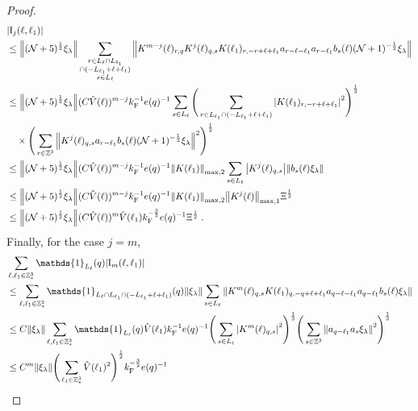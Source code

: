 \documentclass[12pt,a4paper]{article}
\numberwithin{equation}{section}
\newcommand{\1}{\mathbb{I}}
\newcommand{\F}{\mathrm{F}}
\newcommand{\I}{\mathrm{I}}
\newcommand{\Z}{\mathbb{Z}}
\newcommand{\NN}{\mathcal{N}}
\newcommand{\half}{\frac{1}{2}}
\theoremstyle{plain}
\theoremstyle{definition}
\theoremstyle{remark}
\theoremstyle{plain}
\theoremstyle{definition}
\theoremstyle{remark}
\begin{document}
\begin{proof}
\begin{align}
	&|\I_j(\ell, \ell_1)| \nonumber\\
	&\leq \norm{ (\NN+5)^{\half} \xi_\lambda}
		\sum_{\substack{r\in L_{\ell} \cap L_{\ell_1} \\ \cap (-L_{\ell_1} + \ell + \ell_1)\\s\in L_{\ell}}}
		\norm{K^{m-j}(\ell)_{r,q} K^j(\ell)_{q,s} K(\ell_1)_{r,-r+\ell+\ell_1} a_{r-\ell-\ell_1} a_{r-\ell_1} b_{s}(\ell) (\NN+1)^{-\half} \xi_\lambda }\nonumber\\
	&\leq \norm{ (\NN+5)^{\half} \xi_\lambda} 
		(C \hat{V}(\ell))^{m-j} k_{\F}^{-1} e(q)^{-1}
		\sum_{s\in L_{\ell}}
		\Bigg(\sum_{r\in L_{\ell_1} \cap (-L_{\ell_1} + \ell + \ell_1)}\abs{ K(\ell_1)_{r,-r+\ell+\ell_1} }^2\Bigg)^\half \nonumber\\
	&\quad \times\Bigg( \sum_{r \in \Z^3}\norm{K^{j}(\ell)_{q,s} a_{r-\ell_1} b_{s}(\ell) (\NN+1)^{-\half} \xi_\lambda }^2 \Bigg)^\half \nonumber\\
	&\leq \norm{ (\NN+5)^{\half} \xi_\lambda}
		(C \hat{V}(\ell))^{m-j} k_{\F}^{-1} e(q)^{-1}
		\norm{K(\ell_1)}_{\max,2}
		\sum_{s\in L_{\ell}}\abs{K^{j}(\ell)_{q,s}}
		\norm{b_{s}(\ell) \xi_\lambda }		
	\nonumber\\
	&\leq \norm{(\NN+5)^\half \xi_\lambda }
		(C \hat{V}(\ell))^{m-j} k_{\F}^{-1} e(q)^{-1}
		\norm{ K(\ell_1) }_{\max,2}
		\norm{ K^{j}(\ell)}_{\mathrm{max,1}} \Xi^\half \nonumber \\
	&\leq \norm{(\NN+5)^\half \xi_\lambda }
		(C \hat{V}(\ell))^m
		\hat{V}(\ell_1)
		k_{\F}^{-\frac 32} e(q)^{-1} \Xi^\half \;.
\end{align}
Finally, for the case $ j = m $,
\begin{align}
	&\sum_{\ell,\ell_1 \in \Z^3_*} \mathds{1}_{L_\ell}(q) |\I_m(\ell, \ell_1)| \nonumber\\
	&\leq \sum_{\ell,\ell_1 \in \Z^3_*} \mathds{1}_{L_\ell \cap L_{\ell_1} \cap (-L_{\ell_1} + \ell + \ell_1)}(q) \norm{\xi_\lambda}
		\sum\limits_{s \in L_{\ell}}
		\norm{ K^m(\ell)_{q,s} K(\ell_1)_{q,-q+\ell+\ell_1} a_{q-\ell-\ell_1} a_{q-\ell_1} b_{s}(\ell) \xi_\lambda } \nonumber\\
	&\leq C \norm{\xi_\lambda}
		\sum_{\ell,\ell_1 \in \Z^3_*} \mathds{1}_{L_\ell}(q) \hat{V}(\ell_1) k_{\F}^{-1} e(q)^{-1}
		\Bigg( \sum\limits_{s \in L_\ell} \abs{K^m(\ell)_{q,s}}^2\Bigg)^\half \Bigg(\sum\limits_{s \in \Z^3} \norm{ a_{q-\ell_1} a_s \xi_\lambda }^2\Bigg)^\half \nonumber\\
	&\leq C^m \norm{\xi_\lambda }
		\Bigg( \sum_{\ell_1 \in \Z^3_*} \hat{V}(\ell_1)^2 \Bigg)^{\half}
		k_{\F}^{-\frac 32} e(q)^{-1}

\end{align}
\end{proof}
\end{document}
